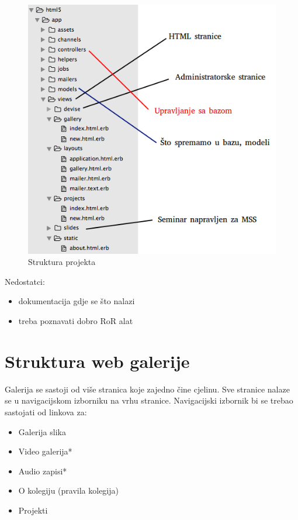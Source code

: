 \documentclass[]{article}
\begin{document}
\begin{figure}[h]
	\centering
	\includegraphics[scale=0.5]{struktura-projekta}
	\caption{Struktura projekta}
	\label{fig:mesh1}
\end{figure}

Nedostatci:
\begin{itemize}
	\item dokumentacija gdje se što nalazi
	\item treba poznavati dobro RoR alat
\end{itemize}
\newpage


\section{Struktura web galerije}

Galerija se sastoji od više stranica koje zajedno čine cjelinu.
Sve stranice nalaze se u navigacijskom izborniku na vrhu stranice. Navigacijski izbornik bi se trebao sastojati od linkova za:

\begin{itemize}
	\item Galerija slika
	\item Video galerija*
	\item Audio zapisi*
	\item O kolegiju (pravila kolegija)
	\item Projekti
\end{itemize}
\end{document}

